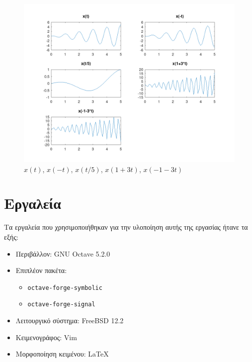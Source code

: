 \documentclass{article}
\begin{document}
\begin{figure}[H]
        \centering
        \includegraphics[width=\linewidth]{res/fig6.png}
        \caption{$x(t)$, $x(-t)$, $x(t/5)$, $x(1+3t)$, $x(-1-3t)$}
\end{figure}

\pagebreak
\section{Εργαλεία}
Τα εργαλεία που χρησιμοποιήθηκαν για την υλοποίηση αυτής της εργασίας ήτανε
τα εξής:
\begin{itemize}
        \item Περιβάλλον: GNU Octave 5.2.0
        \item Επιπλέον πακέτα:
        \begin{itemize}
                \item \lstinline{octave-forge-symbolic}
                \item \lstinline{octave-forge-signal}
        \end{itemize}
        \item Λειτουργικό σύστημα: FreeBSD 12.2
        \item Κειμενογράφος: Vim
        \item Μορφοποίηση κειμένου: \LaTeX
\end{itemize}
\end{document}
